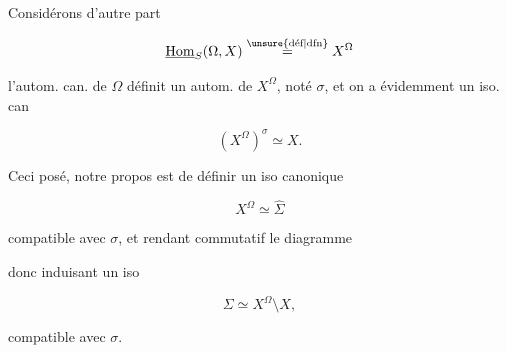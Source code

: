 

Considérons  d'autre part

\[
\underline{\operatorname{Hom}}_S(\Omega,X)\overset{\unsure{\text{déf}|\text{dfn}}}{=}X^\Omega
\]

l'autom. can. de $\Omega$ définit un autom. de $X^\Omega$, noté  $\sigma$,  et on a évidemment un iso. can

\[
(X^\Omega)^\sigma\simeq X.
\]

Ceci posé, notre propos est de définir un iso canonique

\[
X^\Omega\simeq\hat\Sigma
\]

compatible avec $\sigma$, et rendant commutatif le diagramme


donc induisant un iso

\[
\Sigma\simeq X^\Omega\setminus X,
\]

compatible avec $\sigma$.

